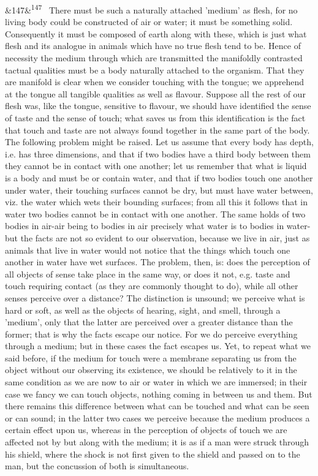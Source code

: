 \documentclass[12pt]{article}
\newcommand{\para}[1][]{\par\noindent\ifx&#1&\else\textsuperscript{\footnotesize #1}~\fi}
\begin{document}
\para[147] There must be such a naturally attached 'medium' as flesh, for no living body could be constructed of air or water; it must be something solid. Consequently it must be composed of earth along with these, which is just what flesh and its analogue in animals which have no true flesh tend to be. Hence of necessity the medium through which are transmitted the manifoldly contrasted tactual qualities must be a body naturally attached to the organism. That they are manifold is clear when we consider touching with the tongue; we apprehend at the tongue all tangible qualities as well as flavour. Suppose all the rest of our flesh was, like the tongue, sensitive to flavour, we should have identified the sense of taste and the sense of touch; what saves us from this identification is the fact that touch and taste are not always found together in the same part of the body. The following problem might be raised. Let us assume that every body has depth, i.e. has three dimensions, and that if two bodies have a third body between them they cannot be in contact with one another; let us remember that what is liquid is a body and must be or contain water, and that if two bodies touch one another under water, their touching surfaces cannot be dry, but must have water between, viz. the water which wets their bounding surfaces; from all this it follows that in water two bodies cannot be in contact with one another. The same holds of two bodies in air-air being to bodies in air precisely what water is to bodies in water-but the facts are not so evident to our observation, because we live in air, just as animals that live in water would not notice that the things which touch one another in water have wet surfaces. The problem, then, is: does the perception of all objects of sense take place in the same way, or does it not, e.g. taste and touch requiring contact (as they are commonly thought to do), while all other senses perceive over a distance? The distinction is unsound; we perceive what is hard or soft, as well as the objects of hearing, sight, and smell, through a 'medium', only that the latter are perceived over a greater distance than the former; that is why the facts escape our notice. For we do perceive everything through a medium; but in these cases the fact escapes us. Yet, to repeat what we said before, if the medium for touch were a membrane separating us from the object without our observing its existence, we should be relatively to it in the same condition as we are now to air or water in which we are immersed; in their case we fancy we can touch objects, nothing coming in between us and them. But there remains this difference between what can be touched and what can be seen or can sound; in the latter two cases we perceive because the medium produces a certain effect upon us, whereas in the perception of objects of touch we are affected not by but along with the medium; it is as if a man were struck through his shield, where the shock is not first given to the shield and passed on to the man, but the concussion of both is simultaneous.
\end{document}
